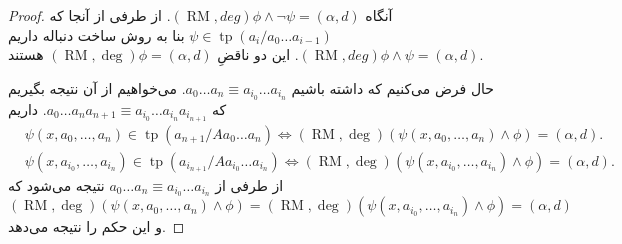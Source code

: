 \documentclass[12pt,a4paper]{report}
\theoremstyle{colorhead}
\DeclareMathOperator{\RM}{RM}
\DeclareMathOperator{\tp}{tp}
\begin{document}
\begin{proof}
آنگاه 
$(\RM,deg)\phi \wedge\neg \psi =(\alpha,d)$.
از طرفی از آنجا که 
$\psi\in \tp(a_i/a_0\ldots a_{i-1})$
بنا به روش ساخت دنباله‌ داریم
$(\RM,deg) \phi\wedge\psi =(\alpha,d)$.
این دو
ناقضِ
$(\RM,\deg)\phi=(\alpha,d)$
هستند.
\par 
حال فرض می‌کنیم که داشته باشیم
$a_0\ldots a_{n}\equiv a_{i_0}\ldots a_{i_n}$.
می‌خواهیم از آن نتیجه بگیریم که
$a_0\ldots a_{n}a_{n+1}\equiv a_{i_0}\ldots a_{i_n}a_{i_{n+1}}$.
داریم
\begin{align*}
& 
\psi(x,a_0,\ldots, a_n)\in \tp(a_{n+1}/Aa_0\ldots a_n) \Leftrightarrow
(\RM,\deg)(\psi(x,a_0,\ldots, a_n)\wedge\phi)=(\alpha,d).
\\
&
\psi(x,a_{i_0},\ldots, a_{i_n})\in \tp(a_{i_{n+1}}/Aa_{i_0}\ldots a_{i_n}) \Leftrightarrow
(\RM,\deg)(\psi(x,a_{i_0},\ldots, a_{i_n})\wedge\phi)=(\alpha,d).
\end{align*}
از طرفی از
$a_0\ldots a_n\equiv a_{i_0}\ldots a_{i_n}$
نتیجه می‌شود که
\[
(\RM,\deg)(\psi(x,a_0,\ldots, a_n)\wedge\phi)=
(\RM,\deg)(\psi(x,a_{i_0},\ldots, a_{i_n})\wedge\phi)=(\alpha,d)
\]
و این حکم را نتیجه می‌دهد.
\end{proof}
\end{document}
